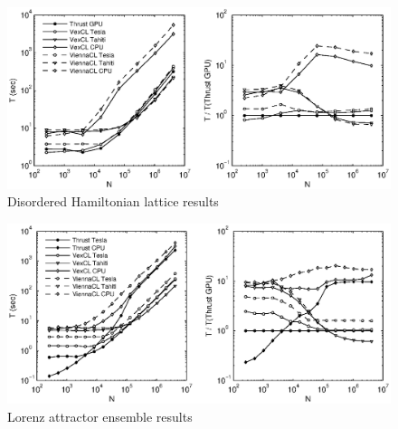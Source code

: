\documentclass[1p]{elsarticle}
\begin{document}
\begin{figure}[p]
    \begin{center}
        \includegraphics[width=\textwidth]{data/disordered_ham_lattice/perfcmp}
    \end{center}
    \caption{Disordered Hamiltonian lattice results}
    \label{fig:lattice:perf}
\end{figure}

\begin{figure}[p]
    \begin{center}
        \includegraphics[width=\textwidth]{data/lorenz_ensemble/perfcmp}
    \end{center}
    \caption{Lorenz attractor ensemble results}
    \label{fig:lorenz:perf}
\end{figure}
\end{document}
